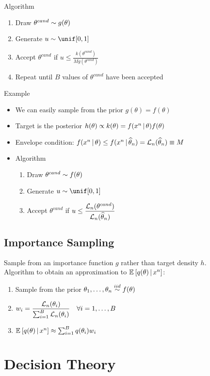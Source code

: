 \documentclass[landscape]{article}
\begin{document}
\begin{multicols*}{2}
Algorithm
\begin{enumerate}
  \item Draw $\theta^{cand} \sim g(\theta)$
  \item Generate $u \dist \unif[0,1]$
  \item Accept $\theta^{cand}$ if
    $u \le \displaystyle\frac{k(\theta^{cand})}{Mg(\theta^{cand})}$
  \item Repeat until $B$ values of $\theta^{cand}$ have been accepted
\end{enumerate}

Example
\begin{itemize}
  \item We can easily sample from the prior $g(\theta) = f(\theta)$
  \item Target is the posterior
    $h(\theta) \propto k(\theta) = f(x^n\,|\, \theta) f(\theta)$
  \item Envelope condition:
    $f(x^n\,|\,\theta) \le f(x^n\,|\,\widehat{\theta}_n) = \mathcal{L}_n(\widehat{\theta}_n)\equiv M$
  \item Algorithm
    \begin{enumerate}
      \item Draw $\theta^{cand} \sim f(\theta)$
      \item Generate $u \dist \unif[0,1]$
      \item Accept $\theta^{cand}$ if
        $u \le \displaystyle\frac{\mathcal{L}_n(\theta^{cand})}{\mathcal{L}_n(\widehat{\theta}_n)}$
    \end{enumerate}
\end{itemize}

\subsection{Importance Sampling}

Sample from an importance function $g$ rather than target density $h$.\\
Algorithm to obtain an approximation to $\mathbb{E}_{}\left[q(\theta) \,|\, x^n\right]$:
\begin{enumerate}
  \item Sample from the prior $\theta_1,\ldots,\theta_n \stackrel{iid}{\sim} f(\theta)$
  \item $w_i = \displaystyle\frac{\mathcal{L}_n(\theta_i)}{\sum_{i=1}^B \mathcal{L}_n(\theta_i)}
    \quad\forall i = 1,\ldots,B$
  \item $\mathbb{E}_{}\left[q(\theta)\,|\, x^n\right] \approx \sum_{i=1}^B q(\theta_i)w_i$
\end{enumerate}

\section{Decision Theory}


\end{multicols*}
\end{document}
